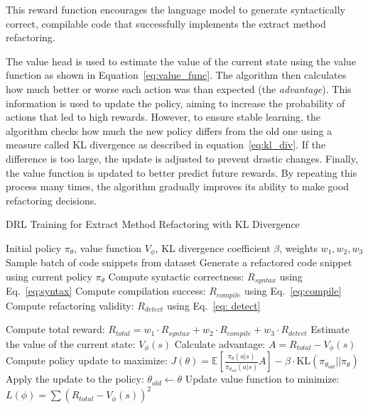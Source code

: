 This reward function encourages the language model to generate syntactically correct, compilable code that successfully implements the extract method refactoring. 


The value head is used to estimate the value of the current state using the value function as shown in Equation~\ref{eq:value_func}. The algorithm then calculates how much better or worse each action was than expected (the \textit{advantage}). This information is used to update the policy, aiming to increase the probability of actions that led to high rewards. However, to ensure stable learning, the algorithm checks how much the new policy differs from the old one using a measure called KL divergence as described in equation~\ref{eq:kl_div}. If the difference is too large, the update is adjusted to prevent drastic changes. Finally, the value function is updated to better predict future rewards. By repeating this process many times, the algorithm gradually improves its ability to make good refactoring decisions. 


\begin{algorithm}
\caption{DRL Training for Extract Method Refactoring with KL Divergence}
\label{algo:2}
\begin{algorithmic}[1]
\Require Initial policy $\pi_\theta$, value function $V_\phi$, KL divergence coefficient $\beta$, weights $w_1, w_2, w_3$
\State Sample batch of code snippets from dataset
\State Generate a refactored code snippet using current policy $\pi_\theta$
\State Compute syntactic correctness: $R_{syntax}$ using Eq.~\ref{eq:syntax}
\State Compute compilation success: $R_{compile}$ using Eq.~\ref{eq:compile}
\State Compute refactoring validity: $R_{detect}$ using Eq.~\ref{eq: detect}

\State Compute total reward: $R_{total} = w_1 \cdot R_{syntax} + w_2 \cdot R_{compile} + w_3 \cdot R_{detect}$
\State Estimate the value of the current state: $V_\phi(s)$
\State Calculate advantage: $A = R_{total} - V_\phi(s)$
\EndFor
\State Compute policy update to maximize:
\State \quad $J(\theta) = \mathbb{E}\left[\frac{\pi_{\theta}(a|s)}{\pi_{\theta_{old}}(a|s)} A\right] - \beta \cdot \text{KL}(\pi_{\theta_{old}} || \pi_{\theta})$
\State Apply the update to the policy: $\theta_{old} \leftarrow \theta$
\State Update value function to minimize: $L(\phi) = \sum (R_{total} - V_\phi(s))^2$
\EndFor
\end{algorithmic}
\end{algorithm}


